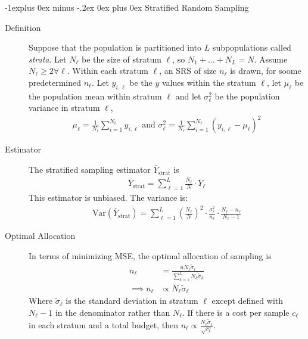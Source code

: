 \documentclass[10pt,landscape]{article}
\makeatletter
\newcommand{\var}{\textrm{Var}}
\renewcommand{\subsection}{\@startsection{subsection}{2}{0mm}%
                                {-1explus 0ex minus -.2ex}%
                                {0ex plus 0ex}%
                                {\normalfont\small\bfseries}}
\makeatother
\begin{document}
\begin{multicols*}{3}
\subsection{Stratified Random Sampling}
\begin{description}
\item[Definition] Suppose that the population is partitioned into $L$ subpopulations called \textit{strata}. Let $N_\ell$ be the size of stratum $\ell$, so $N_1 + \dots + N_L = N$. Assume $N_\ell \geq 2 \forall \ell$. Within each stratum $\ell$, an SRS of size $n_\ell$ is drawn, for soome predetermined $n_\ell$. Let $y_{i, \ell}$ be the $y$ values within the stratum $\ell$, let $\mu_\ell$ be the population mean within stratum $\ell$ and let $\sigma_\ell^2$ be the population variance in stratum $\ell$, 
\begin{align*}
    \mu_\ell = \frac{1}{N_\ell} \sum_{i = 1}^{N_\ell} y_{i, \ell} \text{ and } \sigma_\ell^2 = \frac{1}{N_\ell}\sum_{i = 1}^{N_\ell} (y_{i, \ell} - \mu_\ell)^2
\end{align*} 
\item[Estimator] The stratified sampling estimator $\bar{Y}_{\text{strat}}$ is
\begin{align*}
    \bar{Y}_{\text{strat}} = \sum_{\ell = 1}^L \frac{N_\ell}{N} \cdot \bar{Y}_\ell
\end{align*}
This estimator is unbiased. The variance is:
\begin{align*}
    \var\left(\bar{Y}_{\text{strat}}\right) = \sum_{\ell = 1}^L \left(\frac{N_\ell}{N}\right)^2 \cdot \frac{\sigma_\ell^2}{n_\ell} \cdot \frac{N_\ell - n_\ell}{N_\ell - 1}
\end{align*}
\item[Optimal Allocation] In terms of minimizing MSE, the optimal allocation of sampling is
\begin{align*}
    n_\ell &= \frac{n N_\ell \tilde\sigma_\ell}{\sum_{k = 1}^L N_k \tilde\sigma_k} \\
    \implies n_\ell &\propto N_\ell \tilde\sigma_\ell
\end{align*} 
Where $\tilde\sigma_\ell$ is the standard deviation in stratum $\ell$ except defined with $N_\ell - 1$ in the denominator rather than $N_\ell$. 
If there is a cost per sample $c_\ell$ in each stratum and a total budget, then $n_\ell \propto \frac{N_\ell \tilde\sigma_\ell}{\sqrt{c_\ell}}$. 
\end{description}


\end{multicols*}
\end{document}
